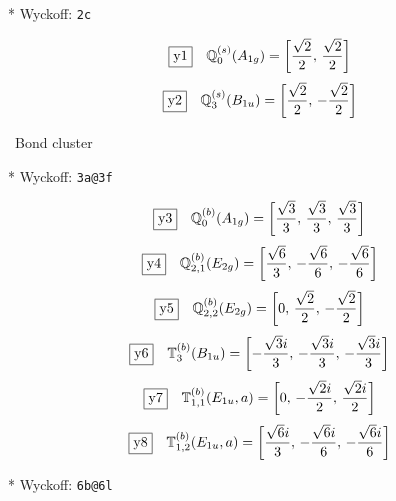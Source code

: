 \documentclass[fleqn,10pt,landscape]{jsarticle}
\begin{document}
\noindent ** Wyckoff: \texttt{2c}

\begin{dmath*}
\fbox{y1}\quad \mathbb{Q}_{0}^{(s)}(A_{1g})=\left[ \frac{\sqrt{2}}{2},\, \frac{\sqrt{2}}{2} \right]
\end{dmath*}
\begin{dmath*}
\fbox{y2}\quad \mathbb{Q}_{3}^{(s)}(B_{1u})=\left[ \frac{\sqrt{2}}{2},\, - \frac{\sqrt{2}}{2} \right]
\end{dmath*}
\vspace{5mm}

\noindent\textbullet\, Bond cluster

\vspace{5mm}

\noindent ** Wyckoff: \texttt{3a@3f}

\begin{dmath*}
\fbox{y3}\quad \mathbb{Q}_{0}^{(b)}(A_{1g})=\left[ \frac{\sqrt{3}}{3},\, \frac{\sqrt{3}}{3},\, \frac{\sqrt{3}}{3} \right]
\end{dmath*}
\begin{dmath*}
\fbox{y4}\quad \mathbb{Q}_{2,1}^{(b)}(E_{2g})=\left[ \frac{\sqrt{6}}{3},\, - \frac{\sqrt{6}}{6},\, - \frac{\sqrt{6}}{6} \right]
\end{dmath*}
\begin{dmath*}
\fbox{y5}\quad \mathbb{Q}_{2,2}^{(b)}(E_{2g})=\left[ 0,\, \frac{\sqrt{2}}{2},\, - \frac{\sqrt{2}}{2} \right]
\end{dmath*}
\begin{dmath*}
\fbox{y6}\quad \mathbb{T}_{3}^{(b)}(B_{1u})=\left[ - \frac{\sqrt{3} i}{3},\, - \frac{\sqrt{3} i}{3},\, - \frac{\sqrt{3} i}{3} \right]
\end{dmath*}
\begin{dmath*}
\fbox{y7}\quad \mathbb{T}_{1,1}^{(b)}(E_{1u},a)=\left[ 0,\, - \frac{\sqrt{2} i}{2},\, \frac{\sqrt{2} i}{2} \right]
\end{dmath*}
\begin{dmath*}
\fbox{y8}\quad \mathbb{T}_{1,2}^{(b)}(E_{1u},a)=\left[ \frac{\sqrt{6} i}{3},\, - \frac{\sqrt{6} i}{6},\, - \frac{\sqrt{6} i}{6} \right]
\end{dmath*}
\vspace{5mm}

\noindent ** Wyckoff: \texttt{6b@6l}
\end{document}
